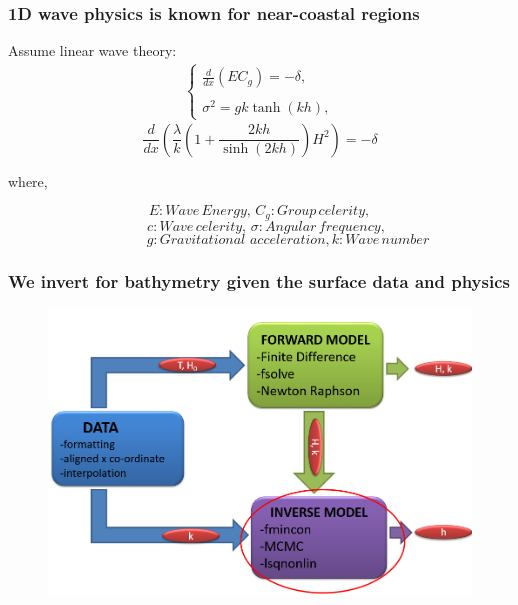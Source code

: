 \documentclass[7pt]{beamer}
\begin{document}
\begin{frame}
	\frametitle{1D wave physics is known for near-coastal regions}
		Assume linear wave theory:
		\begin{eqnarray*}
			\label{fp1}
			\left \{
				\begin{array}{lll}
					\frac{d}{dx}\left(EC_g\right)=-\delta,\\
					\\
					\sigma^2=gk\tanh(kh),
					\label{ode}
				\end{array}
			\right.
		\end{eqnarray*}
		\begin{equation*}
			\frac{d}{dx}\left( \frac{\lambda}{k}\left(1+\frac{2kh}{\sinh(2kh)}\right)H^2 \right)=-\delta
		\end{equation*}  
		\begin{flushleft}
			where,
		\end{flushleft}
		$${E: Wave \,Energy,\, C_{g}: Group \,celerity,}$$
		$${\quad c: Wave \,celerity,\, \sigma: Angular \,frequency,}$$
		$${\quad\quad\quad\quad g: Gravitational\,\, acceleration,k: Wave \,number}$$
\end{frame}

\begin{frame}
 \frametitle{We invert for bathymetry given the surface data and physics}

\begin{figure}[flowchart]
\includegraphics[width=1.0\linewidth]{img/INV.png}\hfill
\end{figure}


\end{frame}
\end{document}
